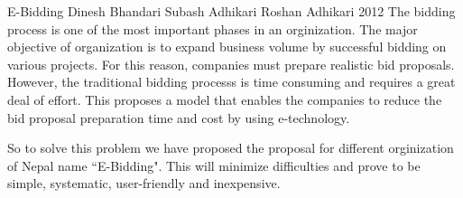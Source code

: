  \begin{conf-abstract}[]
{E-Bidding}
{
 Dinesh Bhandari
 Subash Adhikari
 Roshan Adhikari
}
{2012}
The bidding process is one of the most important phases in an orginization. The major objective of organization is to expand business volume by successful bidding on various projects. For this reason, companies must prepare realistic bid proposals. However, the traditional bidding processs is time consuming and requires a great deal of effort. This proposes a model that enables the companies to reduce the bid proposal preparation time and cost by using e-technology.

So to solve this problem we have proposed the proposal for different orginization of Nepal name ``E-Bidding". This will minimize difficulties and prove to be simple, systematic, user-friendly and inexpensive. 
  \end{conf-abstract}